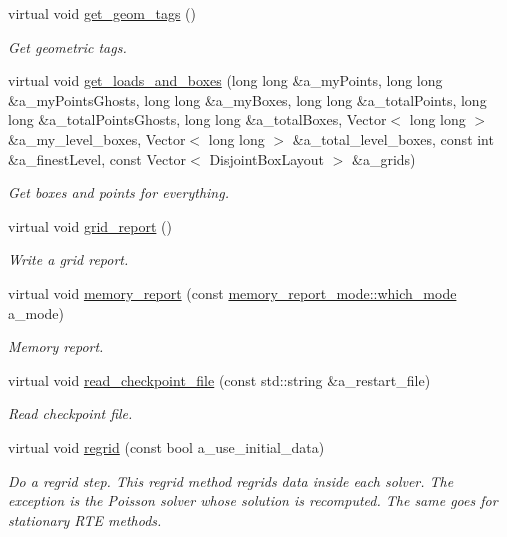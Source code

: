 \begin{DoxyCompactItemize}
virtual void \hyperlink{classplasma__engine_ad1827c25fc1639c87e6f5580e12a358b}{get\+\_\+geom\+\_\+tags} ()
\begin{DoxyCompactList}\small\item\em Get geometric tags. \end{DoxyCompactList}\item 
virtual void \hyperlink{classplasma__engine_ad4994e67f25fa78de4db3907ce7b5a8b}{get\+\_\+loads\+\_\+and\+\_\+boxes} (long long \&a\+\_\+my\+Points, long long \&a\+\_\+my\+Points\+Ghosts, long long \&a\+\_\+my\+Boxes, long long \&a\+\_\+total\+Points, long long \&a\+\_\+total\+Points\+Ghosts, long long \&a\+\_\+total\+Boxes, Vector$<$ long long $>$ \&a\+\_\+my\+\_\+level\+\_\+boxes, Vector$<$ long long $>$ \&a\+\_\+total\+\_\+level\+\_\+boxes, const int \&a\+\_\+finest\+Level, const Vector$<$ Disjoint\+Box\+Layout $>$ \&a\+\_\+grids)
\begin{DoxyCompactList}\small\item\em Get boxes and points for everything. \end{DoxyCompactList}\item 
virtual void \hyperlink{classplasma__engine_a13348e3606d54aacc1e1e2262d15c48e}{grid\+\_\+report} ()
\begin{DoxyCompactList}\small\item\em Write a grid report. \end{DoxyCompactList}\item 
virtual void \hyperlink{classplasma__engine_a0138ae855d87e78774cc9ce98580bcb6}{memory\+\_\+report} (const \hyperlink{namespacememory__report__mode_a7a376e3e2cdf985fc8a6d33aa68c6f44}{memory\+\_\+report\+\_\+mode\+::which\+\_\+mode} a\+\_\+mode)
\begin{DoxyCompactList}\small\item\em Memory report. \end{DoxyCompactList}\item 
virtual void \hyperlink{classplasma__engine_a8dbde2bc9ec4952216412eaa62141253}{read\+\_\+checkpoint\+\_\+file} (const std\+::string \&a\+\_\+restart\+\_\+file)
\begin{DoxyCompactList}\small\item\em Read checkpoint file. \end{DoxyCompactList}\item 
virtual void \hyperlink{classplasma__engine_a7972f104f52c53ea2e3844f2f79997c5}{regrid} (const bool a\+\_\+use\+\_\+initial\+\_\+data)
\begin{DoxyCompactList}\small\item\em Do a regrid step. This regrid method regrids data inside each solver. The exception is the Poisson solver whose solution is recomputed. The same goes for stationary R\+TE methods. \end{DoxyCompactList}\item 

\end{DoxyCompactItemize}

